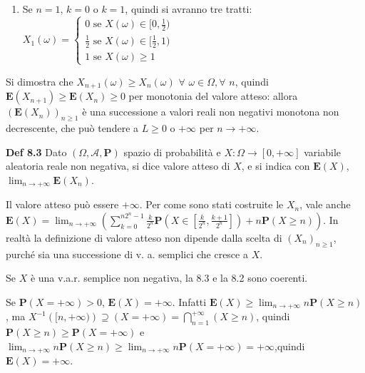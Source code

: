 \documentclass{article}
\begin{document}
\begin{enumerate}
\item Se $n=1$, $k=0$ o $k=1$, quindi si avranno tre tratti: $X_{1}\left(
\omega \right) =\left\{ 
\begin{array}{c}
0\text{ se }X\left( \omega \right) \in \lbrack 0,\frac{1}{2}) \\ 
\frac{1}{2}\text{ se }X\left( \omega \right) \in \lbrack \frac{1}{2},1) \\ 
1\text{ se }X\left( \omega \right) \geq 1%
\end{array}%
\right. $
\end{enumerate}

Si dimostra che $X_{n+1}\left( \omega \right) \geq X_{n}\left( \omega
\right) $ $\forall $ $\omega \in \Omega ,\forall $ $n$, quindi $\mathbf{E}%
\left( X_{n+1}\right) \geq \mathbf{E}\left( X_{n}\right) \geq 0$ per
monotonia del valore atteso: allora $\left( \mathbf{E}\left( X_{n}\right)
\right) _{n\geq 1}$ \`{e} una successione a valori reali non negativi
monotona non decrescente, che pu\`{o} tendere a $L\geq 0$ o $+\infty $ per $%
n\rightarrow +\infty $.

\textbf{Def 8.3 }Dato $\left( \Omega ,\mathcal{A},\mathbf{P}\right) $ spazio
di probabilit\`{a} e $X:\Omega \rightarrow \left[ 0,+\infty \right] $
variabile aleatoria reale non negativa, si dice valore atteso di $X$, e si
indica con $\mathbf{E}\left( X\right) $, $\lim_{n\rightarrow +\infty }%
\mathbf{E}\left( X_{n}\right) $.

Il valore atteso pu\`{o} essere $+\infty $. Per come sono stati costruite le 
$X_{n}$, vale anche $\mathbf{E}\left( X\right) =\lim_{n\rightarrow +\infty
}\left( \sum_{k=0}^{n2^{n}-1}\frac{k}{2^{n}}\mathbf{P}\left( X\in \left[ 
\frac{k}{2^{n}},\frac{k+1}{2^{n}}\right] \right) +n\mathbf{P}\left( X\geq
n\right) \right) $. In realt\`{a} la definizione di valore atteso non
dipende dalla scelta di $\left( X_{n}\right) _{n\geq 1}$, purch\'{e} sia una
successione di v. a. semplici che cresce a $X$.

Se $X$ \`{e} una v.a.r. semplice non negativa, la 8.3 e la 8.2 sono coerenti.

Se $\mathbf{P}\left( X=+\infty \right) >0$, $\mathbf{E}\left( X\right)
=+\infty $. Infatti $\mathbf{E}\left( X\right) \geq \lim_{n\rightarrow
+\infty }n\mathbf{P}\left( X\geq n\right) $, ma $X^{-1}\left( [n,+\infty
)\right) \supseteq \left( X=+\infty \right) =\bigcap_{n=1}^{+\infty }\left(
X\geq n\right) $, quindi $\mathbf{P}\left( X\geq n\right) \geq \mathbf{P}%
\left( X=+\infty \right) $ e $\lim_{n\rightarrow +\infty }n\mathbf{P}\left(
X\geq n\right) \geq \lim_{n\rightarrow +\infty }n\mathbf{P}\left( X=+\infty
\right) =+\infty $,quindi $\mathbf{E}\left( X\right) =+\infty $.
\end{document}
